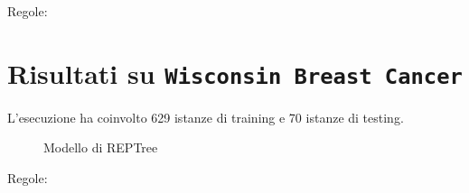 \begin{mdframed}[frametitle=Esecuzione JRip]
	\scriptsize
\end{mdframed}



\noindent
\normalsize Regole:
\scriptsize

\pagebreak

\section{Risultati su \texttt{Wisconsin Breast Cancer}}

\normalsize L'esecuzione ha coinvolto 629 istanze di training e 70 istanze di testing.

\begin{mdframed}[frametitle=Esecuzione REPTree]
	\footnotesize
\end{mdframed}



\begin{figure}[htb]
	\caption{Modello di REPTree}
\end{figure}

\begin{mdframed}[frametitle=Esecuzione JRip]
	\footnotesize
\end{mdframed}



\noindent
\normalsize Regole:
\footnotesize